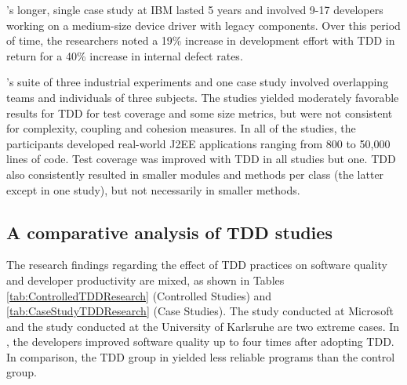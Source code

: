 \documentclass[smallextended]{svjour3}     %
\begin{document}
\cite{Sanchez:07}'s longer, single case study at IBM lasted 5 years and involved 9-17 developers working on 
a medium-size device
driver with legacy components. Over this period of time, the researchers noted a 19\% increase in development effort 
with TDD in return 
for a 40\% increase in internal defect rates. 

\cite{Janzen:08}'s suite of three industrial experiments and one case study involved overlapping teams and individuals of 
three
subjects. The studies yielded moderately favorable results for TDD for test coverage and some size metrics, 
but were not consistent for complexity, coupling and cohesion measures. In all of the studies, the participants developed
real-world J2EE applications
ranging from 800 to 50,000 lines of code. 
Test coverage was improved with TDD in all studies but one. TDD also consistently resulted in smaller modules and methods per
 class (the latter except
in one study), but not necessarily in 
smaller methods.


\subsection{A comparative analysis of TDD studies}

The research findings regarding the effect of TDD practices on software quality 
and developer productivity are mixed,  as shown in 
Tables \ref{tab:ControlledTDDResearch} (Controlled Studies) and \ref{tab:CaseStudyTDDResearch} (Case Studies). 
The study conducted at Microsoft \citep{Bhat:06} and the study conducted 
at the University of Karlsruhe \citep{Muller:02} are two extreme cases. In 
\cite{Bhat:06}, the developers improved software quality up to four 
times after adopting TDD. In comparison, the TDD group in \cite{Muller:02} 
yielded less reliable programs than the control group. 
\end{document}

